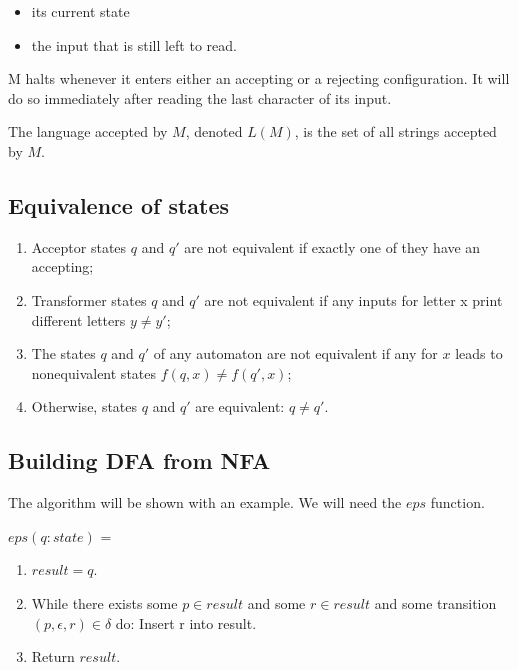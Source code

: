 \documentclass[hidelinks,12pt]{article}
\begin{document}
\begin{itemize}
    \item its current state 
    \item the input that is still left to read.
\end{itemize}

M halts whenever it enters either an accepting or a rejecting configuration. It
will do so immediately after reading the last character of its input.

The language accepted by $M$, denoted $L(M)$, is the set of all strings accepted by
$M$.

\subsection{Equivalence of states}

\begin{enumerate}
    \item Acceptor states $q$ and $q'$ are not equivalent if exactly one of
        they have an accepting;

    \item Transformer states $q$ and $q'$ are not equivalent if any inputs
        for letter x print different letters $y \ne y'$;

    \item The states $q$ and $q'$ of any automaton are not equivalent if any
        for $x$ leads to nonequivalent states $f(q,x) \ne f(q',x)$;

    \item Otherwise, states $q$ and $q'$ are equivalent: $q \ne q'$.
\end{enumerate}

\subsection{Building DFA from NFA}

The algorithm will be shown with an example. We will need the $eps$ function.

$eps(q: state)$ =
\begin{enumerate}
    \item $result = {q}$.
    \item While there exists some $p \in result$ and some $r \in result$ and some transition $(p, \epsilon, r) \in \delta$ do:
        Insert r into result.
    \item Return $result$.
\end{enumerate}
\end{document}
